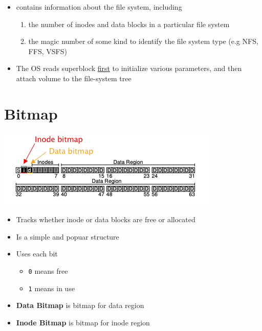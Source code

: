 \documentclass[12pt]{article}
\begin{document}
\begin{itemize}
    \item contains information about the file system, including

    \begin{enumerate}[1.]
        \item the number of inodes and data blocks in a particular file system
        \item the magic number of some kind to identify the file system type (e.g NFS, FFS, VSFS)
    \end{enumerate}

    \item The OS reads superblock \underline{first} to initialize various parameters,
    and then attach volume to the file-system tree
\end{itemize}

\section*{Bitmap}

\begin{center}
\includegraphics[width=\linewidth]{../images/midterm_2_solution_22.png}
\end{center}

\begin{itemize}
    \item Tracks whether inode or data blocks are free or allocated
    \item Is a simple and popuar structure
    \item Uses each bit
    \begin{itemize}
        \item \texttt{0} means free
        \item \texttt{1} means in use
    \end{itemize}

    \item \textbf{Data Bitmap} is bitmap for data region
    \item \textbf{Inode Bitmap} is bitmap for inode region
\end{itemize}
\end{document}

